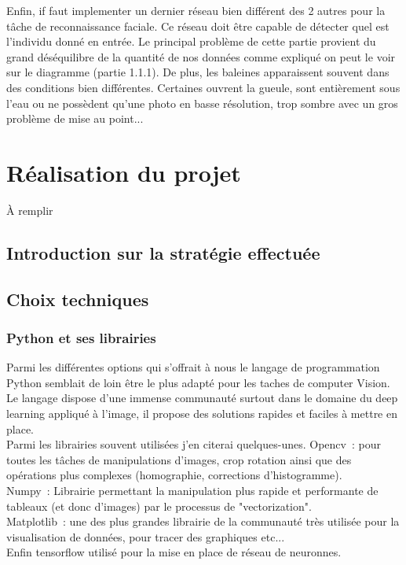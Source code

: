 \documentclass[12pt,a4paper]{report}
\begin{document}
\begin{spacing}{1.5}
Enfin, if faut implementer un dernier réseau bien différent des 2 autres pour la tâche de reconnaissance faciale. Ce réseau doit être capable de détecter quel est l'individu donné en entrée. Le principal problème de cette partie provient du grand déséquilibre de la quantité de nos données comme expliqué on peut le voir sur le diagramme (partie 1.1.1).  De plus, les baleines apparaissent souvent dans des conditions bien différentes. Certaines ouvrent la gueule, sont entièrement sous l’eau ou ne possèdent qu’une photo en basse résolution, trop sombre avec un gros problème de mise au point...




\newpage


\section{Réalisation du projet}
À remplir 
\subsection{Introduction sur la stratégie effectuée}

\subsection{Choix techniques}
\subsubsection{Python et ses librairies}
Parmi les différentes options qui s'offrait à nous le langage de programmation Python semblait de loin être le plus adapté pour les taches de computer Vision. Le langage dispose d'une immense communauté surtout dans le domaine du deep learning appliqué à l'image, il propose des solutions rapides et faciles à mettre en place.
\\
Parmi les librairies souvent utilisées j’en citerai quelques-unes.
Opencv : pour toutes les tâches de manipulations d'images, crop rotation ainsi que des opérations plus complexes (homographie, corrections d'histogramme).
\\
Numpy : Librairie permettant la manipulation plus rapide et performante de tableaux (et donc d'images) par le processus de "vectorization".
\\
Matplotlib : une des plus grandes librairie de la communauté très utilisée pour la visualisation de données, pour tracer des graphiques etc...
\\
Enfin tensorflow utilisé pour la mise en place de réseau de neuronnes.


\end{spacing}
\end{document}
